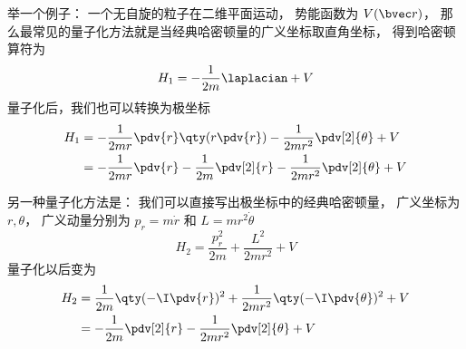 
\begin{issues}
\issueDraft
\end{issues}

举一个例子： 一个无自旋的粒子在二维平面运动， 势能函数为 $V(\bvec r)$， 那么最常见的量子化方法就是当经典哈密顿量的广义坐标取直角坐标， 得到哈密顿算符为
\begin{equation}
H_1 = -\frac{1}{2m} \laplacian + V
\end{equation}
量子化后，我们也可以转换为极坐标
\begin{equation}
\begin{aligned}
H_1 &= -\frac{1}{2mr}\pdv{r}\qty(r \pdv{r}) - \frac{1}{2mr^2} \pdv[2]{\theta} + V\\
&= -\frac{1}{2mr}\pdv{r} -\frac{1}{2m}\pdv[2]{r} - \frac{1}{2mr^2} \pdv[2]{\theta} + V
\end{aligned}
\end{equation}

另一种量子化方法是： 我们可以直接写出极坐标中的经典哈密顿量， 广义坐标为 $r, \theta$， 广义动量分别为 $p_r = m\dot r$ 和 $L = mr^2\dot\theta$
\begin{equation}
H_2 = \frac{p_r^2}{2m} + \frac{L^2}{2mr^2} + V
\end{equation}
量子化以后变为
\begin{equation}
\begin{aligned}
H_2 &= \frac{1}{2m}\qty(-\I\pdv{r})^2 + \frac{1}{2mr^2}\qty(-\I\pdv{\theta})^2 + V\\
&= -\frac{1}{2m}\pdv[2]{r} - \frac{1}{2mr^2} \pdv[2]{\theta} + V
\end{aligned}
\end{equation}
